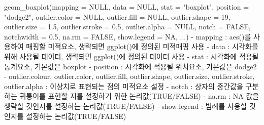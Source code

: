 \documentclass[
]{article}
\newenvironment{Shaded}{\begin{snugshade}}{\end{snugshade}}
\newcommand{\AttributeTok}[1]{\textcolor[rgb]{0.77,0.63,0.00}{#1}}
\newcommand{\ConstantTok}[1]{\textcolor[rgb]{0.00,0.00,0.00}{#1}}
\newcommand{\DecValTok}[1]{\textcolor[rgb]{0.00,0.00,0.81}{#1}}
\newcommand{\FloatTok}[1]{\textcolor[rgb]{0.00,0.00,0.81}{#1}}
\newcommand{\FunctionTok}[1]{\textcolor[rgb]{0.00,0.00,0.00}{#1}}
\newcommand{\NormalTok}[1]{#1}
\newcommand{\SpecialCharTok}[1]{\textcolor[rgb]{0.00,0.00,0.00}{#1}}
\newcommand{\StringTok}[1]{\textcolor[rgb]{0.31,0.60,0.02}{#1}}
\begin{document}
\begin{Shaded}
\begin{Highlighting}[]
\FunctionTok{geom\_boxplot}\NormalTok{(}\AttributeTok{mapping =} \ConstantTok{NULL}\NormalTok{, }\AttributeTok{data =} \ConstantTok{NULL}\NormalTok{, }\AttributeTok{stat =} \StringTok{"boxplot"}\NormalTok{, }\AttributeTok{position =} \StringTok{"dodge2"}\NormalTok{, }\AttributeTok{outlier.color =} \ConstantTok{NULL}\NormalTok{, }\AttributeTok{outlier.fill =} \ConstantTok{NULL}\NormalTok{, }\AttributeTok{outlier.shape =} \DecValTok{19}\NormalTok{, }\AttributeTok{outlier.size =} \FloatTok{1.5}\NormalTok{, }\AttributeTok{outlier.stroke =} \FloatTok{0.5}\NormalTok{, }\AttributeTok{outlier.alpha =} \ConstantTok{NULL}\NormalTok{, }\AttributeTok{notch =} \ConstantTok{FALSE}\NormalTok{, }\AttributeTok{notchwidth =} \FloatTok{0.5}\NormalTok{, }\AttributeTok{na.rm =} \ConstantTok{FALSE}\NormalTok{, }\AttributeTok{show.legend =} \ConstantTok{NA}\NormalTok{, ...)}
  \SpecialCharTok{{-}}\NormalTok{ mapping }\SpecialCharTok{:} \FunctionTok{aes}\NormalTok{()를 사용하여 매핑할 미적요소, 생략되면 }\FunctionTok{ggplot}\NormalTok{()에 정의된 미적매핑 사용}
  \SpecialCharTok{{-}}\NormalTok{ data }\SpecialCharTok{:}\NormalTok{ 시각화를 위해 사용될 데이터, 생략되면 }\FunctionTok{ggplot}\NormalTok{()에 정의된 데이터 사용}
  \SpecialCharTok{{-}}\NormalTok{ stat }\SpecialCharTok{:}\NormalTok{ 시각화에 적용될 통계요소, 기본값은 }\StringTok{\textquotesingle{}boxplot\textquotesingle{}}
  \SpecialCharTok{{-}}\NormalTok{ position }\SpecialCharTok{:}\NormalTok{ 시각화에 적용될 위치요소, 기본값은 }\StringTok{\textquotesingle{}dodge2\textquotesingle{}}
  \SpecialCharTok{{-}}\NormalTok{ outlier.colour, outlier.color, outlier.fill, outlier.shape, outlier.size, outlier.stroke, outlier.alpha }\SpecialCharTok{:}\NormalTok{ 이상치로 표현되는 점의 미적요소 설정}
  \SpecialCharTok{{-}}\NormalTok{ notch }\SpecialCharTok{:}\NormalTok{ 상자의 중간값을 구분하는 귀퉁이를 표현할 지를 설정하기 위한 논리값(}\ConstantTok{TRUE}\SpecialCharTok{/}\ConstantTok{FALSE}\NormalTok{)}
  \SpecialCharTok{{-}}\NormalTok{ na.rm }\SpecialCharTok{:} \ConstantTok{NA}\NormalTok{ 값을 생략할 것인지를 설정하는 논리값(}\ConstantTok{TRUE}\SpecialCharTok{/}\ConstantTok{FALSE}\NormalTok{)}
  \SpecialCharTok{{-}}\NormalTok{ show.legend }\SpecialCharTok{:}\NormalTok{ 범례를 사용할 것인지를 설정하는 논리값(}\ConstantTok{TRUE}\SpecialCharTok{/}\ConstantTok{FALSE}\NormalTok{) }
\end{Highlighting}
\end{Shaded}
\end{document}
